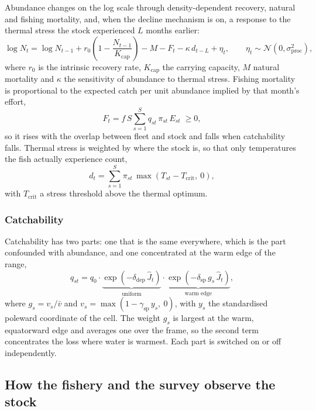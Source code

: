 \documentclass[11pt,a4paper]{article}
\newcommand{\vt}[1]{\text{#1}}
\begin{document}
Abundance changes on the log scale through density-dependent recovery, natural and fishing mortality, and, when the decline mechanism is on, a response to the thermal stress the stock experienced $L$ months earlier:
\begin{equation}
\log N_t = \log N_{t-1} + r_0\!\left(1-\frac{N_{t-1}}{K_{\vt{cap}}}\right) - M - F_t - \kappa\,d_{t-L} + \eta_t, \qquad \eta_t\sim\mathcal{N}(0,\sigma^2_{\vt{proc}}),
\label{eq:abund}
\end{equation}
where $r_0$ is the intrinsic recovery rate, $K_{\vt{cap}}$ the carrying capacity, $M$ natural mortality and $\kappa$ the sensitivity of abundance to thermal stress. Fishing mortality is proportional to the expected catch per unit abundance implied by that month's effort,
\begin{equation}
F_t = f\,S\sum_{s=1}^{S} q_{st}\,\pi_{st}\,E_{st} \;\ge 0,
\label{eq:F}
\end{equation}
so it rises with the overlap between fleet and stock and falls when catchability falls. Thermal stress is weighted by where the stock is, so that only temperatures the fish actually experience count,
\begin{equation}
d_t = \sum_{s=1}^{S}\pi_{st}\,\max(T_{st}-T_{\vt{crit}},\ 0),
\label{eq:dose}
\end{equation}
with $T_{\vt{crit}}$ a stress threshold above the thermal optimum.

\subsubsection{Catchability}

Catchability has two parts: one that is the same everywhere, which is the part confounded with abundance, and one concentrated at the warm edge of the range,
\begin{equation}
q_{st} = q_0 \cdot \underbrace{\exp\!\left(-\delta_{\vt{dep}}\,\hat J_t\right)}_{\vt{uniform}} \cdot \underbrace{\exp\!\left(-\delta_{\vt{sp}}\,g_s\,\hat J_t\right)}_{\vt{warm edge}},
\label{eq:q}
\end{equation}
where $g_s = v_s/\bar v$ and $v_s = \max(1-\gamma_{\vt{sp}}\,y_s,\ 0)$, with $y_s$ the standardised poleward coordinate of the cell. The weight $g_s$ is largest at the warm, equatorward edge and averages one over the frame, so the second term concentrates the loss where water is warmest. Each part is switched on or off independently.

\subsection{How the fishery and the survey observe the stock}
\end{document}
